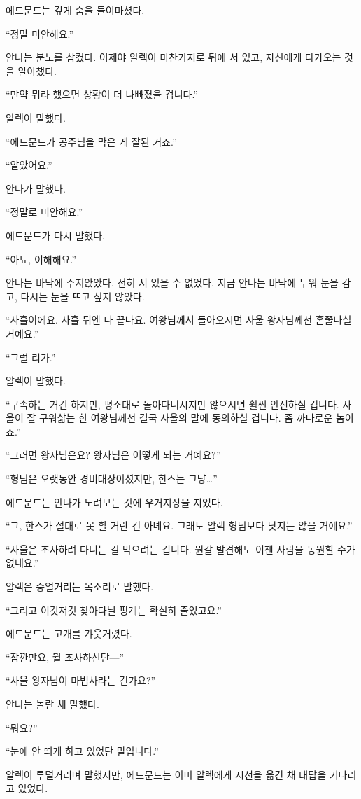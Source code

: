 에드문드는 깊게 숨을 들이마셨다.

``정말 미안해요.''

안나는 분노를 삼켰다. 이제야 알렉이 마찬가지로 뒤에 서 있고, 자신에게 다가오는 것을 알아챘다.

``만약 뭐라 했으면 상황이 더 나빠졌을 겁니다.''

알렉이 말했다.

``에드문드가 공주님을 막은 게 잘된 거죠.''

``알았어요.''

안나가 말했다.

``정말로 미안해요.''

에드문드가 다시 말했다.

``아뇨, 이해해요.''

안나는 바닥에 주저앉았다. 전혀 서 있을 수 없었다. 지금 안나는 바닥에 누워 눈을 감고, 다시는 눈을 뜨고 싶지 않았다.

``사흘이에요. 사흘 뒤엔 다 끝나요. 여왕님께서 돌아오시면 사울 왕자님께선 혼쭐나실 거예요.''

``그럴 리가.''

알렉이 말했다.

``구속하는 거긴 하지만, 평소대로 돌아다니시지만 않으시면 훨씬 안전하실 겁니다. 사울이 잘 구워삶는 한 여왕님께선 결국 사울의 말에 동의하실 겁니다. 좀 까다로운 놈이죠.''

``그러면 왕자님은요? 왕자님은 어떻게 되는 거예요?''

``형님은 오랫동안 경비대장이셨지만, 한스는 그냥\ldots''

에드문드는 안나가 노려보는 것에 우거지상을 지었다.

``그, 한스가 절대로 못 할 거란 건 아녜요. 그래도 알렉 형님보다 낫지는 않을 거예요.''

``사울은 조사하려 다니는 걸 막으려는 겁니다. 뭔갈 발견해도 이젠 사람을 동원할 수가 없네요.''

알렉은 중얼거리는 목소리로 말했다.

``그리고 이것저것 찾아다닐 핑계는 확실히 줄었고요.''

에드문드는 고개를 갸웃거렸다.

``잠깐만요, 뭘 조사하신단—''

``사울 왕자님이 마법사라는 건가요?''

안나는 놀란 채 말했다.

``뭐요?''

``눈에 안 띄게 하고 있었단 말입니다.''

알렉이 투덜거리며 말했지만, 에드문드는 이미 알렉에게 시선을 옮긴 채 대답을 기다리고 있었다.


